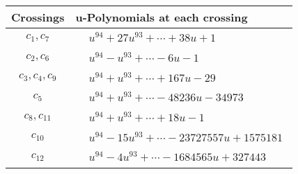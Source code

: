\documentclass[1p]{elsarticle_modified}
\theoremstyle{definition}
\begin{document}
\begin{tabular}{m{50pt}|m{274pt}}
Crossings & \hspace{64pt}u-Polynomials at each crossing \\
\hline $$\begin{aligned}c_{1},c_{7}\end{aligned}$$&$\begin{aligned}
&u^{94}+27 u^{93}+\cdots+38 u+1
\end{aligned}$\\
\hline $$\begin{aligned}c_{2},c_{6}\end{aligned}$$&$\begin{aligned}
&u^{94}- u^{93}+\cdots-6 u-1
\end{aligned}$\\
\hline $$\begin{aligned}c_{3},c_{4},c_{9}\end{aligned}$$&$\begin{aligned}
&u^{94}+u^{93}+\cdots+167 u-29
\end{aligned}$\\
\hline $$\begin{aligned}c_{5}\end{aligned}$$&$\begin{aligned}
&u^{94}+u^{93}+\cdots-48236 u-34973
\end{aligned}$\\
\hline $$\begin{aligned}c_{8},c_{11}\end{aligned}$$&$\begin{aligned}
&u^{94}+u^{93}+\cdots+18 u-1
\end{aligned}$\\
\hline $$\begin{aligned}c_{10}\end{aligned}$$&$\begin{aligned}
&u^{94}-15 u^{93}+\cdots-23727557 u+1575181
\end{aligned}$\\
\hline $$\begin{aligned}c_{12}\end{aligned}$$&$\begin{aligned}
&u^{94}-4 u^{93}+\cdots-1684565 u+327443
\end{aligned}$\\
\hline
\end{tabular}\\~\\
\newpage\renewcommand{\arraystretch}{1}
\end{document}
